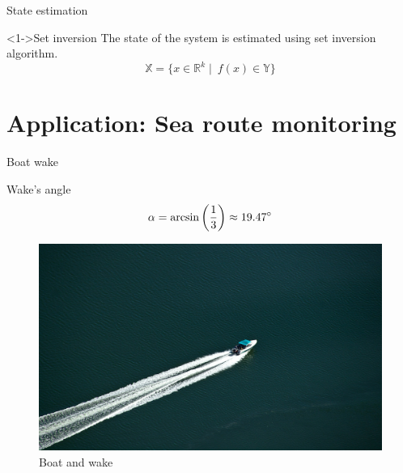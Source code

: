 \documentclass{beamer}
\begin{document}
        \begin{frame}{State estimation}
            \begin{block}<1->{Set inversion}
                The state of the system is estimated using set inversion algorithm.
                \begin{equation}
                    \mathbb{X} = \lbrace x \in \mathbb{R}^k \mid\ f(x) \in \mathbb{Y}\rbrace
                \end{equation}
            \end{block}
        \end{frame}

    \section{Application: Sea route monitoring}

        \begin{frame}{Boat wake}
            \centering
            \begin{minipage}{0.6\textwidth}
                \begin{block}{Wake's angle}
                    \begin{equation}
                        \alpha = \arcsin\left(\frac{1}{3}\right) \approx 19.47 \degree
                    \end{equation}
                \end{block}
                \vspace{0.2cm}
                \begin{figure}
                    \centering
                    \includegraphics[width=\textwidth,trim={0 0 17cm 14cm},clip]{imgs/motorboat}
                    \caption{Boat and wake}
                \end{figure}
            \end{minipage}
        \end{frame}
\end{document}
